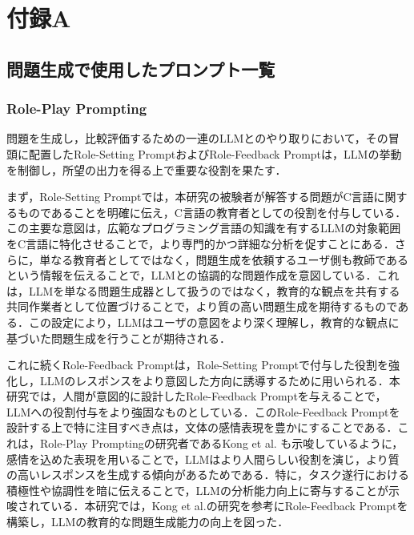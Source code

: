 \documentclass[11pt]{jreport}
\begin{document}
\chapter*{付録A}  %
\begin{appendices}
\renewcommand{\thesection}{\Alph{section}}
\renewcommand{\thesubsection}{\thesection.\arabic{subsection}}
\renewcommand{\thefigure}{\thesection.\arabic{figure}}

\section{問題生成で使用したプロンプト一覧}
\subsection{Role-Play Prompting}
問題を生成し，比較評価するための一連のLLMとのやり取りにおいて，その冒頭に配置したRole-Setting PromptおよびRole-Feedback Promptは，LLMの挙動を制御し，所望の出力を得る上で重要な役割を果たす．

まず，Role-Setting Promptでは，本研究の被験者が解答する問題がC言語に関するものであることを明確に伝え，C言語の教育者としての役割を付与している．この主要な意図は，広範なプログラミング言語の知識を有するLLMの対象範囲をC言語に特化させることで，より専門的かつ詳細な分析を促すことにある．さらに，単なる教育者としてではなく，問題生成を依頼するユーザ側も教師であるという情報を伝えることで，LLMとの協調的な問題作成を意図している．これは，LLMを単なる問題生成器として扱うのではなく，教育的な観点を共有する共同作業者として位置づけることで，より質の高い問題生成を期待するものである．この設定により，LLMはユーザの意図をより深く理解し，教育的な観点に基づいた問題生成を行うことが期待される．

これに続くRole-Feedback Promptは，Role-Setting Promptで付与した役割を強化し，LLMのレスポンスをより意図した方向に誘導するために用いられる．本研究では，人間が意図的に設計したRole-Feedback Promptを与えることで，LLMへの役割付与をより強固なものとしている．このRole-Feedback Promptを設計する上で特に注目すべき点は，文体の感情表現を豊かにすることである．これは，Role-Play Promptingの研究者であるKong et al. \cite{Role_play}も示唆しているように，感情を込めた表現を用いることで，LLMはより人間らしい役割を演じ，より質の高いレスポンスを生成する傾向があるためである．特に，タスク遂行における積極性や協調性を暗に伝えることで，LLMの分析能力向上に寄与することが示唆されている．本研究では，Kong et al.の研究を参考にRole-Feedback Promptを構築し，LLMの教育的な問題生成能力の向上を図った．



\end{appendices}
\end{document}
